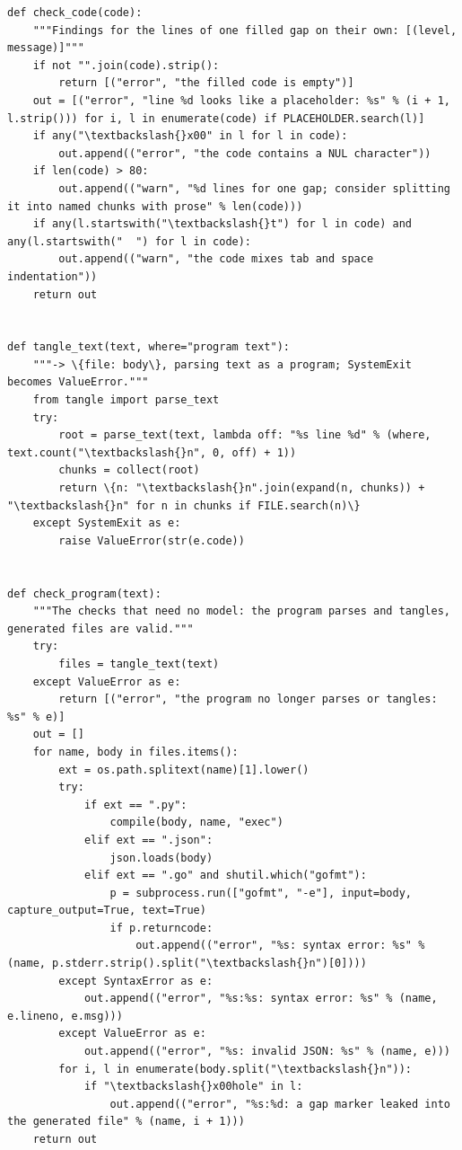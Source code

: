 \documentclass[10pt,a4paper]{article}
\newcounter{chunk}
\begin{document}
\begin{Verbatim}
def check_code(code):
    """Findings for the lines of one filled gap on their own: [(level, message)]"""
    if not "".join(code).strip():
        return [("error", "the filled code is empty")]
    out = [("error", "line %d looks like a placeholder: %s" % (i + 1, l.strip())) for i, l in enumerate(code) if PLACEHOLDER.search(l)]
    if any("\textbackslash{}x00" in l for l in code):
        out.append(("error", "the code contains a NUL character"))
    if len(code) > 80:
        out.append(("warn", "%d lines for one gap; consider splitting it into named chunks with prose" % len(code)))
    if any(l.startswith("\textbackslash{}t") for l in code) and any(l.startswith("  ") for l in code):
        out.append(("warn", "the code mixes tab and space indentation"))
    return out


def tangle_text(text, where="program text"):
    """-> \{file: body\}, parsing text as a program; SystemExit becomes ValueError."""
    from tangle import parse_text
    try:
        root = parse_text(text, lambda off: "%s line %d" % (where, text.count("\textbackslash{}n", 0, off) + 1))
        chunks = collect(root)
        return \{n: "\textbackslash{}n".join(expand(n, chunks)) + "\textbackslash{}n" for n in chunks if FILE.search(n)\}
    except SystemExit as e:
        raise ValueError(str(e.code))


def check_program(text):
    """The checks that need no model: the program parses and tangles, generated files are valid."""
    try:
        files = tangle_text(text)
    except ValueError as e:
        return [("error", "the program no longer parses or tangles: %s" % e)]
    out = []
    for name, body in files.items():
        ext = os.path.splitext(name)[1].lower()
        try:
            if ext == ".py":
                compile(body, name, "exec")
            elif ext == ".json":
                json.loads(body)
            elif ext == ".go" and shutil.which("gofmt"):
                p = subprocess.run(["gofmt", "-e"], input=body, capture_output=True, text=True)
                if p.returncode:
                    out.append(("error", "%s: syntax error: %s" % (name, p.stderr.strip().split("\textbackslash{}n")[0])))
        except SyntaxError as e:
            out.append(("error", "%s:%s: syntax error: %s" % (name, e.lineno, e.msg)))
        except ValueError as e:
            out.append(("error", "%s: invalid JSON: %s" % (name, e)))
        for i, l in enumerate(body.split("\textbackslash{}n")):
            if "\textbackslash{}x00hole" in l:
                out.append(("error", "%s:%d: a gap marker leaked into the generated file" % (name, i + 1)))
    return out



\end{Verbatim}
\end{document}
